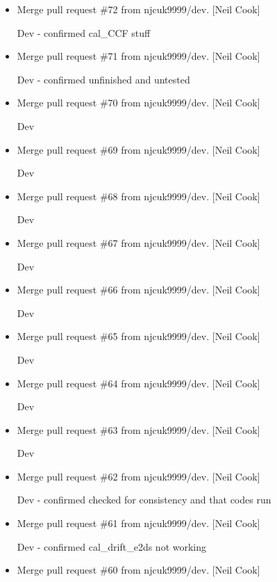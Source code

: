 \documentclass[a4paper,10pt,english]{report}
\begin{document}
\begin{itemize}
\item {} 
Merge pull request \#72 from njcuk9999/dev. {[}Neil Cook{]}

Dev - confirmed cal\_CCF stuff

\item {} 
Merge pull request \#71 from njcuk9999/dev. {[}Neil Cook{]}

Dev - confirmed unfinished and untested

\item {} 
Merge pull request \#70 from njcuk9999/dev. {[}Neil Cook{]}

Dev

\item {} 
Merge pull request \#69 from njcuk9999/dev. {[}Neil Cook{]}

Dev

\item {} 
Merge pull request \#68 from njcuk9999/dev. {[}Neil Cook{]}

Dev

\item {} 
Merge pull request \#67 from njcuk9999/dev. {[}Neil Cook{]}

Dev

\item {} 
Merge pull request \#66 from njcuk9999/dev. {[}Neil Cook{]}

Dev

\item {} 
Merge pull request \#65 from njcuk9999/dev. {[}Neil Cook{]}

Dev

\item {} 
Merge pull request \#64 from njcuk9999/dev. {[}Neil Cook{]}

Dev

\item {} 
Merge pull request \#63 from njcuk9999/dev. {[}Neil Cook{]}

Dev

\item {} 
Merge pull request \#62 from njcuk9999/dev. {[}Neil Cook{]}

Dev - confirmed checked for consistency and that codes run

\item {} 
Merge pull request \#61 from njcuk9999/dev. {[}Neil Cook{]}

Dev - confirmed cal\_drift\_e2ds not working

\item {} 
Merge pull request \#60 from njcuk9999/dev. {[}Neil Cook{]}


\end{itemize}
\end{document}
